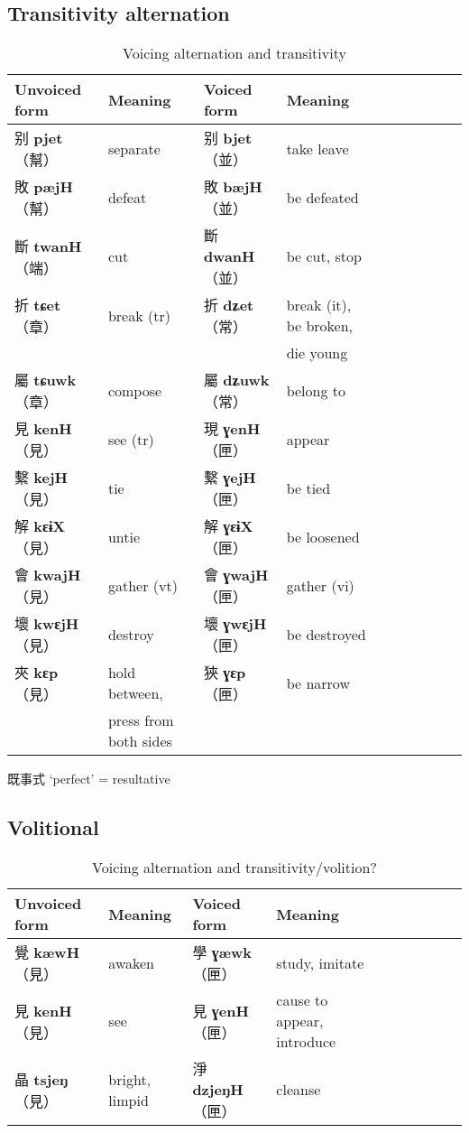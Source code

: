 \documentclass[oneside,a4paper,11pt]{article}
\newcommand{\ipa}[1]{\textbf{{\phon\mbox{#1}}}} %
\newcommand{\zh}[1]{{\cn #1}}
\newcommand{\zhc}[2]{\zh{#1} \ipa{#2}}
\newcommand{\mc}[1]{\zh{（#1）}}
\begin{document}
 
 \subsection{Transitivity alternation}
 
 
  \citet[79-80]{zhou62goucibian}
\begin{table}[H]
\caption{Voicing alternation and transitivity}
\begin{tabular}{llllllllll}
\toprule
Unvoiced form &Meaning & Voiced form & Meaning\\
\midrule
\zhc{别}{pjet} \mc{幫}	&separate & \zhc{别}{bjet} \mc{並} & take leave \\
\zhc{敗}{pæjH} \mc{幫}	&defeat & \zhc{敗}{bæjH} \mc{並} & be defeated \\
\midrule
\zhc{斷}{twanH} \mc{端}	&cut & \zhc{斷}{dwanH} \mc{並} & be cut, stop \\
\midrule
\zhc{折}{tɕet} \mc{章}	&break (tr) & \zhc{折}{dʑet} \mc{常} &break (it), be broken, \\
&&&die young \\
\zhc{屬}{tɕuwk} \mc{章}	&compose & \zhc{屬}{dʑuwk} \mc{常} &belong to \\
\midrule 
\zhc{見}{kenH} \mc{見}	&see (tr) & \zhc{現}{ɣenH} \mc{匣} & appear \\
\zhc{繫}{kejH} \mc{見}	&tie & \zhc{繫}{ɣejH} \mc{匣} & be tied \\
\zhc{解}{kɛɨX} \mc{見}	&untie & \zhc{解}{ɣɛɨX} \mc{匣} & be loosened \\
\zhc{會}{kwajH} \mc{見}	&gather (vt) & \zhc{會}{ɣwajH} \mc{匣} & gather (vi) \\
\zhc{壞}{kwɛjH} \mc{見}	&destroy  & \zhc{壞}{ɣwɛjH} \mc{匣} & be destroyed \\
\zhc{夾}{kɛp} \mc{見}	&hold between,   & \zhc{狹}{ɣɛp} \mc{匣} & be narrow \\
&press from both sides&&\\
\bottomrule
\end{tabular}
\end{table}

\citet{downer73loanwords, sagart03prenasalized}

\zh{既事式}  `perfect' = resultative  \citet[86]{zhou62goucibian}


\subsection{Volitional}
\citet[55]{bs14oc}
\begin{table}[H]
\caption{Voicing alternation and transitivity/volition?}
\begin{tabular}{llllllllll}
\toprule
Unvoiced form &Meaning & Voiced form & Meaning\\
\midrule
\zhc{覺}{kæwH} \mc{見}	&awaken & \zhc{學}{ɣæwk} \mc{匣} & study, imitate \\
\zhc{見}{kenH} \mc{見}	&see & \zhc{見}{ɣenH} \mc{匣} & cause to appear, introduce \\
\zhc{晶}{tsjeŋ} \mc{見}	&bright, limpid & \zhc{淨}{dzjeŋH} \mc{匣} & cleanse\\
\bottomrule
\end{tabular}
\end{table}
\end{document}
